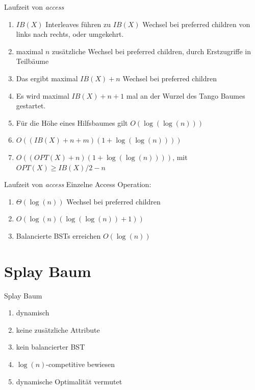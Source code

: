\documentclass[11pt]{beamer}
\begin{document}
\begin{frame} {Laufzeit von \textit{access}}
	\begin{enumerate}
         \item $\mathit{IB}\left(X\right)$ Interleaves führen zu $\mathit{IB}\left(X\right)$  Wechsel bei preferred children von links nach rechts, oder umgekehrt.
         \item maximal $n$ zusätzliche Wechsel bei preferred children, durch Erstzugriffe in Teilbäume 
         \pause
         \item Das ergibt maximal  $\mathit{IB}\left(X\right) + n$ Wechsel bei preferred children 
         \pause
         \item Es wird maximal $\mathit{IB}\left(X\right) + n + 1$ mal an der Wurzel des Tango Baumes gestartet.
         \item Für die Höhe eines Hilfsbaumes gilt $O\left(\log\left(\log\left(n\right)\right)\right)$
         \pause
         \item $O\left(\left(\mathit{IB}\left(X\right) + n +m \right) \left( 1 + \log \left(\log\left(n\right)\right)\right) \right)$
         \pause
         \item 	$O\left(\left(\mathit{OPT}\left(X\right) + n  \right) \left( 1 + \log \left(\log\left(n\right)\right)\right) \right)$, mit $\mathit{OPT}\left(X\right) \geq \mathit{IB}\left(X\right) /2 -n $
    \end{enumerate} 
\end{frame}

\begin{frame} {Laufzeit von \textit{access}}
	Einzelne Access Operation:
	\begin{enumerate}
		\item $\Theta\left(\log\left(n\right)\right)$ Wechsel bei preferred children
		\pause
		\item $  O \left(\log\left(n\right)   \left( \log \left(\log\left(n\right)\right) + 1\right)\right)$
		\pause
		\item Balancierte BSTs erreichen $O \left( \log\left(n\right)\right)$
	\end{enumerate} 
\end{frame}

\section{Splay Baum}
\begin{frame} {Splay Baum}
	\begin{enumerate}
		\item dynamisch
		\item keine zusätzliche Attribute
		\item kein balancierter BST
		\item $\log \left(n\right)$-competitive bewiesen
		\item dynamische Optimalität vermutet
	\end{enumerate} 
\end{frame}
\end{document}
